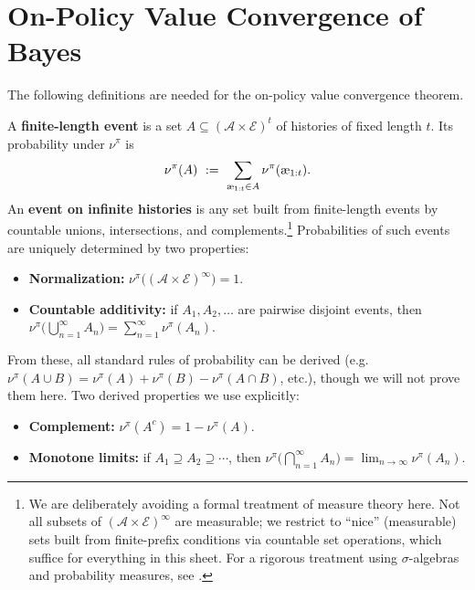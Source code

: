 \documentclass[fontsize=11pt, parskip=half]{scrartcl}
\newcommand{\cA}{\mathcal{A}}
\newcommand{\cE}{\mathcal{E}}
\newcommand{\aes}{\textnormal{\ae}}
\begin{document}


\section{On-Policy Value Convergence of Bayes}\label{prob:on_policy}



The following definitions are needed for the on-policy value convergence theorem.

\begin{definition}\label{def:events}
A \textbf{finite-length event} is a set $A \subseteq (\cA \times \cE)^t$ of histories of fixed length $t$.
Its probability under $\nu^\pi$ is
\[
    \nu^\pi(A) ~:=~ \sum_{\aes_{1:t} \in A} \nu^\pi(\aes_{1:t}).
\]
An \textbf{event on infinite histories} is any set built from finite-length events by countable unions, intersections, and complements.\footnote{We are deliberately avoiding a formal treatment of measure theory here. Not all subsets of $(\cA \times \cE)^\infty$ are measurable; we restrict to ``nice'' (measurable) sets built from finite-prefix conditions via countable set operations, which suffice for everything in this sheet. For a rigorous treatment using $\sigma$-algebras and probability measures, see \cite[Chapter 2.2]{Hutter:24uaibook2}.}
Probabilities of such events are uniquely determined by two properties:
\begin{itemize}\itemsep=2pt
    \item \textbf{Normalization:} $\nu^\pi\!\big((\cA \times \cE)^\infty\big) = 1$.
    \item \textbf{Countable additivity:} if $A_1, A_2, \ldots$ are pairwise disjoint events, then $\nu^\pi\!\big(\bigcup_{n=1}^\infty A_n\big) = \sum_{n=1}^\infty \nu^\pi(A_n)$.
\end{itemize}
From these, all standard rules of probability can be derived (e.g.\ $\nu^\pi(A \cup B) = \nu^\pi(A) + \nu^\pi(B) - \nu^\pi(A \cap B)$, etc.), though we will not prove them here. Two derived properties we use explicitly:
\begin{itemize}\itemsep=2pt
    \item \textbf{Complement:} $\nu^\pi(A^c) = 1 - \nu^\pi(A)$.
    \item \textbf{Monotone limits:} if $A_1 \supseteq A_2 \supseteq \cdots$, then $\nu^\pi\!\big(\bigcap_{n=1}^\infty A_n\big) = \lim_{n \to \infty} \nu^\pi(A_n)$.

\end{itemize}
\end{definition}
\end{document}
